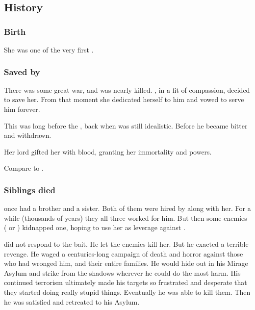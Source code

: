 \subsection{History}





\subsubsection{Birth}
She was one of the very first \scathae{}. 





\subsubsection{Saved by \Ishnaruchaefir}
There was some great war, and \Criseis{} was nearly killed. 
\Ishnaruchaefir, in a fit of compassion, decided to save her. 
From that moment she dedicated herself to him and vowed to serve him forever. 

This was long before the \secondbanewar, back when \Ishnaruchaefir{} was still idealistic. 
Before he became bitter and withdrawn. 

Her lord gifted her with \xzaishannic{} blood, granting her immortality and \daemonic{} powers. 

Compare to . 





\subsubsection{Siblings died}
\Criseis{} once had a brother and a sister. 
Both of them were hired by \Ishnaruchaefir{} along with her. 
For a while (thousands of years) they all three worked for him. 
But then some enemies (\resphain{} or \dragons) kidnapped one, hoping to use her as leverage against \Ishnaruchaefir. 

\Ishnaruchaefir{} did not respond to the bait. 
He let the enemies kill her. 
But he exacted a terrible revenge. 
He waged a centuries-long campaign of death and horror against those who had wronged him, and their entire families. 
He would hide out in his Mirage Asylum and strike from the shadows wherever he could do the most harm. 
His continued terrorism ultimately made his targets so frustrated and desperate that they started doing really stupid things. 
Eventually he was able to kill them. 
Then he was satisfied and retreated to his Asylum. 

